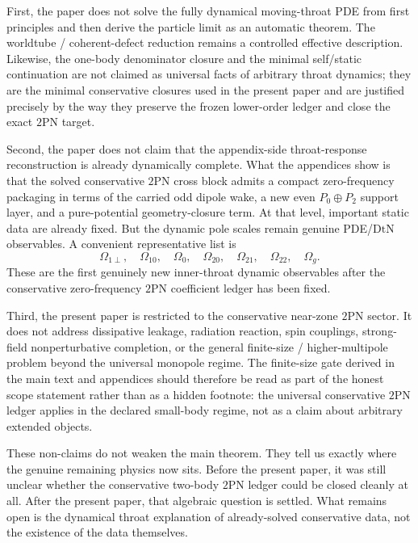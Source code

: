 \documentclass[11pt]{article}
\newcommand{\TwoPN}{\mathrm{2PN}}
\newcommand{\DtN}{\mathrm{DtN}}
\begin{document}
First, the paper does not solve the fully dynamical moving-throat PDE from first
principles and then derive the particle limit as an automatic theorem.
The worldtube / coherent-defect reduction remains a controlled effective description.
Likewise, the one-body denominator closure and the minimal self/static continuation are
not claimed as universal facts of arbitrary throat dynamics; they are the minimal
conservative closures used in the present paper and are justified precisely by the way
they preserve the frozen lower-order ledger and close the exact \(\TwoPN\) target.

Second, the paper does not claim that the appendix-side throat-response reconstruction is
already dynamically complete.
What the appendices show is that the solved conservative \(\TwoPN\) cross block admits a
compact zero-frequency packaging in terms of the carried odd dipole wake, a new even
\(P_0\oplus P_2\) support layer, and a pure-potential geometry-closure term.
At that level, important static data are already fixed.
But the dynamic pole scales remain genuine PDE/\(\DtN\) observables.
A convenient representative list is
\begin{equation}
\Omega_{1\perp},\quad
\Omega_{10},\quad
\Omega_0,\quad
\Omega_{20},\quad
\Omega_{21},\quad
\Omega_{22},\quad
\Omega_g.
\label{eq:conclusion-open-poles}
\end{equation}
These are the first genuinely new inner-throat dynamic observables after the
conservative zero-frequency \(\TwoPN\) coefficient ledger has been fixed.

Third, the present paper is restricted to the conservative near-zone \(\TwoPN\) sector.
It does not address dissipative leakage, radiation reaction, spin couplings, strong-field
nonperturbative completion, or the general finite-size / higher-multipole problem beyond
the universal monopole regime.
The finite-size gate derived in the main text and appendices should therefore be read as
part of the honest scope statement rather than as a hidden footnote: the universal
conservative \(\TwoPN\) ledger applies in the declared small-body regime, not as a claim
about arbitrary extended objects.

These non-claims do not weaken the main theorem.
They tell us exactly where the genuine remaining physics now sits.
Before the present paper, it was still unclear whether the conservative two-body
\(\TwoPN\) ledger could be closed cleanly at all.
After the present paper, that algebraic question is settled.
What remains open is the dynamical throat explanation of already-solved conservative data,
not the existence of the data themselves.
\end{document}
